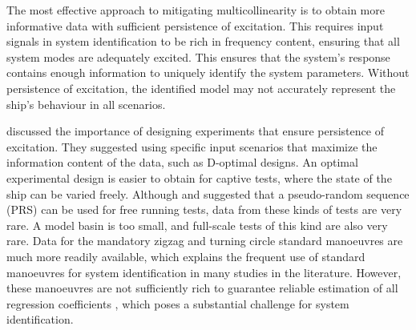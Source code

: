 The most effective approach to mitigating multicollinearity is to obtain more informative data with sufficient persistence of excitation. This requires input signals in system identification to be rich in frequency content, ensuring that all system modes are adequately excited. This ensures that the system's response contains enough information to uniquely identify the system parameters. Without persistence of excitation, the identified model may not accurately represent the ship's behaviour in all scenarios.

\textcite{yoonIdentificationHydrodynamicCoefficients2003} discussed the importance of designing experiments that ensure persistence of excitation. They suggested using specific input scenarios that maximize the information content of the data, such as D-optimal designs. An optimal experimental design is easier to obtain for captive tests, where the state of the ship can be varied freely. Although \textcite{wangOptimalDesignExcitation2020} and \textcite{millerShipModelIdentification2021} suggested that a pseudo-random sequence (PRS) can be used for free running tests, data from these kinds of tests are very rare. A model basin is too small, and full-scale tests of this kind are also very rare. 
Data for the mandatory zigzag and turning circle standard manoeuvres \cite{imoStandardsShipManoeuvrability2002} are much more readily available, which explains the frequent use of standard manoeuvres for system identification in many studies in the literature. However, these manoeuvres are not sufficiently rich to guarantee reliable estimation of all regression coefficients \cite{sutuloAlgorithmOfflineIdentification2014}, which poses a substantial challenge for system identification.

